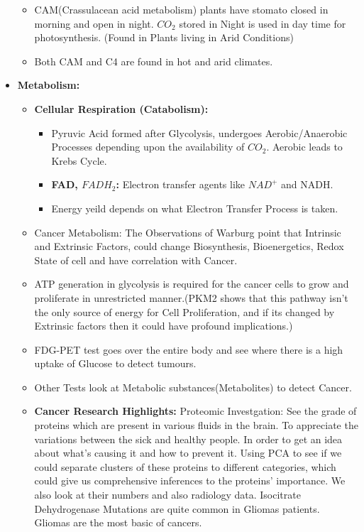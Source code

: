 \documentclass{article}
\begin{document}
\begin{itemize}
\begin{itemize}
    \item CAM(Crassulacean acid metabolism) plants have stomato closed in morning and open in night. $CO_2$ stored in Night is used in day time for photosynthesis. (Found in Plants living in Arid Conditions)

    \item Both CAM and C4 are found in hot and arid climates.
  \end{itemize}

  \item \textbf{Metabolism:}
  \begin{itemize}
    \item \textbf{Cellular Respiration (Catabolism):}
    \begin{itemize}
      \item Pyruvic Acid formed after Glycolysis, undergoes Aerobic/Anaerobic Processes depending upon the availability of $CO_2$. Aerobic leads to Krebs Cycle.
      \item \textbf{FAD, $FADH_2$:} Electron transfer agents like $NAD^{+}$ and NADH.
      \item  Energy yeild depends on what Electron Transfer Process is taken.
    \end{itemize}
    \item Cancer Metabolism: The Observations of Warburg point that Intrinsic and Extrinsic Factors, could change Biosynthesis, Bioenergetics, Redox State of cell and have correlation with Cancer.
    \item ATP generation in glycolysis is required for the cancer cells to grow and proliferate in unrestricted manner.(PKM2 shows that this pathway isn't the only source of energy for Cell Proliferation, and if its changed by Extrinsic factors then it could have profound implications.)
    \item FDG-PET test goes over the entire body and see where there is a high uptake of Glucose to detect tumours.
    \item Other Tests look at Metabolic substances(Metabolites) to detect Cancer.
    \item \textbf{Cancer Research Highlights:} Proteomic Investgation: See the grade of proteins which are present in various fluids in the brain. To appreciate the variations between the sick and healthy people. In order to get an idea about what's causing it and how to prevent it. Using PCA to see if we could separate clusters of these proteins to different categories, which could give us comprehensive inferences to the proteins' importance. We also look at their numbers and also radiology data.
    Isocitrate Dehydrogenase Mutations are quite common in Gliomas patients. Gliomas are the most basic of cancers.
  \end{itemize}
\end{itemize}
\end{document}

